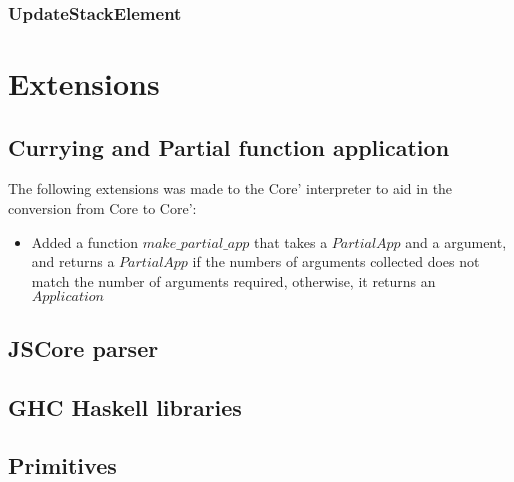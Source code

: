 \subsubsection*{UpdateStackElement}



\section{Extensions}


\subsection{Currying and Partial function application}



The following extensions was made to the Core' interpreter to aid in the conversion from
Core to Core':

\begin{itemize}
\item Added a function $make\_partial\_app$ that takes a $PartialApp$ and a argument, and returns
a $PartialApp$ if the numbers of arguments collected does not match the number of arguments required,
otherwise, it returns an $Application$
\end{itemize}






\subsection{JSCore parser}

\subsection{GHC Haskell libraries}



\subsection{Primitives}


